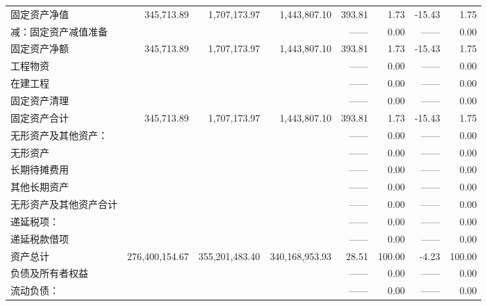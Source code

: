 \begin{longtable}{>{\scriptsize}p{8em}>{\scriptsize}r>{\scriptsize}r>{\scriptsize}r>{\scriptsize}r>{\scriptsize}r>{\scriptsize}r>{\scriptsize}r}
\hspace{2ex}固定资产净值	&	345,713.89	&	1,707,173.97	&	1,443,807.10	&	393.81	&	1.73	&	-15.43	&	1.75	\\
\hspace{2ex}\hspace{2ex}减：固定资产减值准备	&		&		&		&	——	&	0.00	&	——	&	0.00	\\
\hspace{2ex}固定资产净额	&	345,713.89	&	1,707,173.97	&	1,443,807.10	&	393.81	&	1.73	&	-15.43	&	1.75	\\
\hspace{2ex}工程物资	&		&		&		&	——	&	0.00	&	——	&	0.00	\\
\hspace{2ex}在建工程	&		&		&		&	——	&	0.00	&	——	&	0.00	\\
\hspace{2ex}固定资产清理	&		&		&		&	——	&	0.00	&	——	&	0.00	\\
\hspace{2ex}\hspace{2ex}\hspace{2ex}  固定资产合计	&	345,713.89	&	1,707,173.97	&	1,443,807.10	&	393.81	&	1.73	&	-15.43	&	1.75	\\
\midrule
无形资产及其他资产：	&		&		&		&	——	&	0.00	&	——	&	0.00	\\
\hspace{2ex}无形资产	&		&		&		&	——	&	0.00	&	——	&	0.00	\\
\hspace{2ex}长期待摊费用	&		&		&		&	——	&	0.00	&	——	&	0.00	\\
\hspace{2ex}其他长期资产	&		&		&		&	——	&	0.00	&	——	&	0.00	\\
\hspace{2ex}无形资产及其他资产合计	&		&		&		&	——	&	0.00	&	——	&	0.00	\\
递延税项：	&		&		&		&	——	&	0.00	&	——	&	0.00	\\
\hspace{2ex}递延税款借项	&		&		&		&	——	&	0.00	&	——	&	0.00	\\
\hspace{2ex}\hspace{2ex}\hspace{2ex}资产总计	&	276,400,154.67	&	355,201,483.40	&	340,168,953.93	&	28.51	&	100.00	&	-4.23	&	100.00	\\
\midrule
负债及所有者权益	&		&		&		&	——	&	0.00	&	——	&	0.00	\\
流动负债：	&		&		&		&	——	&	0.00	&	——	&	0.00	\\

\end{longtable}
